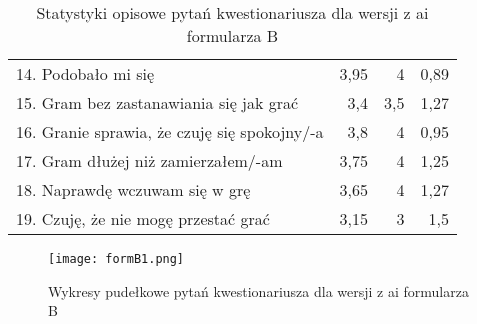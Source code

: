 \begin{table}[h!]
\begin{center}
\begin{tabular}{|m{10em}|r|r|r|}
            14. Podobało mi się                                               & 3,95          & 4       & 0,89           \\
            15. Gram bez zastanawiania się jak grać                           & 3,4           & 3,5     & 1,27           \\
            16. Granie sprawia, \newline że czuję się spokojny/-a             & 3,8           & 4       & 0,95           \\
            17. Gram dłużej \newline niż zamierzałem/-am                      & 3,75          & 4       & 1,25           \\
            18. Naprawdę wczuwam się w grę                                    & 3,65          & 4       & 1,27           \\
            19. Czuję, że nie mogę przestać grać                              & 3,15          & 3       & 1,5            \\
            \hline
        \end{tabular}
    \end{center}
    \caption{Statystyki opisowe pytań kwestionariusza dla wersji z \gls{ai} formularza B}\label{tab1:appendixB_7}
\end{table}

\begin{figure}[h!]
    \centering
    \texttt{[image: formB1.png]}
    \caption{Wykresy pudełkowe pytań kwestionariusza dla wersji z \gls{ai} formularza B}
    \label{fig:appendixB_formB1}
\end{figure}

